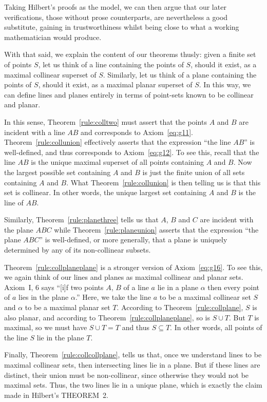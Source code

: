 Taking Hilbert's proofs as the model, we can then argue that our later verifications, those without prose counterparts, are nevertheless a good substitute, gaining in trustworthiness whilst being close to what a working mathematician would produce.

With that said, we explain the content of our theorems thusly: given a finite set of points $S$, let us think of a line containing the points of $S$, should it exist, as a maximal collinear superset of $S$. Similarly, let us think of a plane containing the points of $S$, should it exist, as a maximal planar superset of $S$. In this way, we can define lines and planes entirely in terms of point-sets known to be collinear and planar.

In this sense, Theorem~\ref{rule:colltwo} must assert that the points $A$ and $B$ are incident with a line $AB$ and corresponds to Axiom~\ref{eq:g11}.  Theorem~\ref{rule:collunion} effectively asserts that the expression ``the line $AB$'' is well-defined, and thus corresponds to Axiom~\ref{eq:g12}. To see this, recall that the line $AB$ is the unique maximal superset of all points containing $A$ and $B$. Now the largest possible set containing $A$ and $B$ is just the finite union of all sets containing $A$ and $B$. What Theorem~\ref{rule:collunion} is then telling us is that this set is collinear. In other words, the unique largest set containing $A$ and $B$ is the line of $AB$.

Similarly, Theorem~\ref{rule:planethree} tells us that $A$, $B$ and $C$ are incident with the plane $ABC$ while Theorem~\ref{rule:planeunion} asserts that the expression ``the plane $ABC$'' is well-defined, or more generally, that a plane is uniquely determined by any of its non-collinear subsets.

Theorem~\ref{rule:collplaneplane} is a stronger version of Axiom~\ref{eq:g16}. To see this, we again think of our lines and planes as maximal collinear and planar sets. Axiom~I, 6 says ``[i]f two points $A$, $B$ of a line $a$ lie in a plane $\alpha$ then every point of $a$ lies in the plane $\alpha$.'' Here, we take the line $a$ to be a maximal collinear set $S$ and $\alpha$ to be a maximal planar set $T$. According to Theorem~\ref{rule:collplane}, $S$ is also planar, and according to Theorem~\ref{rule:collplaneplane}, so is $S \cup T$. But $T$ is maximal, so we must have $S \cup T = T$ and thus $S \subseteq T$. In other words, all points of the line $S$ lie in the plane $T$.

Finally, Theorem~\ref{rule:collcollplane}, tells us that, once we understand lines to be maximal collinear sets, then intersecting lines lie in a plane. But if these lines are distinct, their union must be non-collinear, since otherwise they would not be maximal sets. Thus, the two lines lie in a unique plane, which is exactly the claim made in Hilbert's THEOREM~2.

